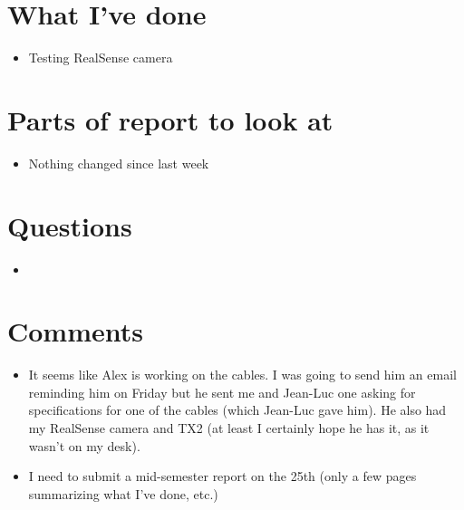 \documentclass[12pt,a4paper]{article}
\begin{document}
\author{Katrina Ashton}


\pagestyle{fancy}
\fancyhf{}
\rhead{\thepage}

\section{What I've done}
\begin{itemize}
\item{Testing RealSense camera}
\end{itemize}

\section{Parts of report to look at}
\begin{itemize}
\item{Nothing changed since last week}
\end{itemize}

\section{Questions}
\begin{itemize}
\item{}
\end{itemize}

\section{Comments}
\begin{itemize}
\item{It seems like Alex is working on the cables. I was going to send him an email reminding him on Friday but he sent me and Jean-Luc one asking for specifications for one of the cables (which Jean-Luc gave him). He also had my RealSense camera and TX2 (at least I certainly hope he has it, as it wasn't on my desk).}
\item{I need to submit a mid-semester report on the 25th (only a few pages summarizing what I've done, etc.)}
\end{itemize}
\end{document}
